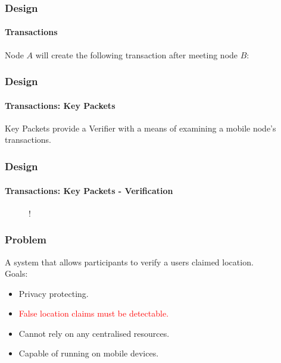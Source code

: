 \documentclass{beamer}
\begin{document}
	\begin{frame}[noframenumbering]
		\frametitle{Design}
		\framesubtitle{Transactions}
		Node $A$ will create the following transaction after meeting node $B$:
		\newline
		
		\begin{center}
		\end{center}
	\end{frame}
	
	\begin{frame}
		\frametitle{Design}
		\framesubtitle{Transactions: Key Packets}
		Key Packets provide a Verifier with a means of examining a mobile node's transactions.
		\newline
		
	\end{frame}
	
	\begin{frame}[b]
		\frametitle{Design}
		\framesubtitle{Transactions: Key Packets - Verification}
		\vspace{-0.5cm}
		\begin{figure}
			\resizebox {\columnwidth} {!} {}
		\end{figure}
	\end{frame}
	
	\begin{frame}[noframenumbering]
    	\frametitle{Problem}
    	A system that allows participants to verify a users claimed location.
    	\\
    	\null
    	Goals:
   		\begin{itemize}
    		\item Privacy protecting.
    		\item \textcolor{red}{False location claims must be detectable.}
    		\item Cannot rely on any centralised resources.
    		\item Capable of running on mobile devices.
    	\end{itemize}
	\end{frame}
	
\end{document}
